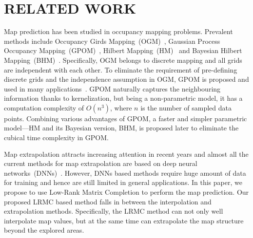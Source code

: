 \section{RELATED WORK}

Map prediction has been studied in occupancy mapping problems.  
Prevalent methods include Occupancy Girds Mapping~(OGM)~\cite{elfes1989using}, Gaussian Process Occupancy Mapping~(GPOM)~\cite{o2012gaussian, wang2016fast}, Hilbert Mapping~(HM)~\cite{ramos2016hilbert} and Bayesian Hilbert Mapping~(BHM)~\cite{senanayake2017bayesian}. Specifically, OGM belongs to discrete mapping and all grids are independent with each other. To eliminate the requirement of pre-defining discrete grids and the independence assumption in OGM, GPOM is proposed and used in many applications~\cite{jadidi2014exploration, jadidi2015mutual}. GPOM naturally captures the neighbouring information thanks to kernelization, but being a non-parametric model, it has a computation complexity of $O(n^3)$, where $n$ is the number of sampled data points. Combining various advantages of GPOM, a faster and simpler parametric model---HM and its Bayesian version, BHM, is proposed later to eliminate the cubical time complexity in GPOM.

Map extrapolation 
attracts increasing attention in recent years and almost all the current methods for map extrapolation are based on deep neural networks~(DNNs)~\cite{caley2019deep, pronobis2017learning, katyal2018occupancy, shrestha2019learned, saroya2020online, katyal2019uncertainty}. However, DNNs based methods require huge amount of data for training and hence are still limited in general applications. In this paper, we propose to use Low-Rank Matrix Completion to perform the map prediction. 
Our proposed LRMC based method falls in between the {interpolation} and {extrapolation} methods. Specifically, the LRMC method can not only well interpolate map values, but at the same time can  extrapolate the map structure beyond the explored areas. 

